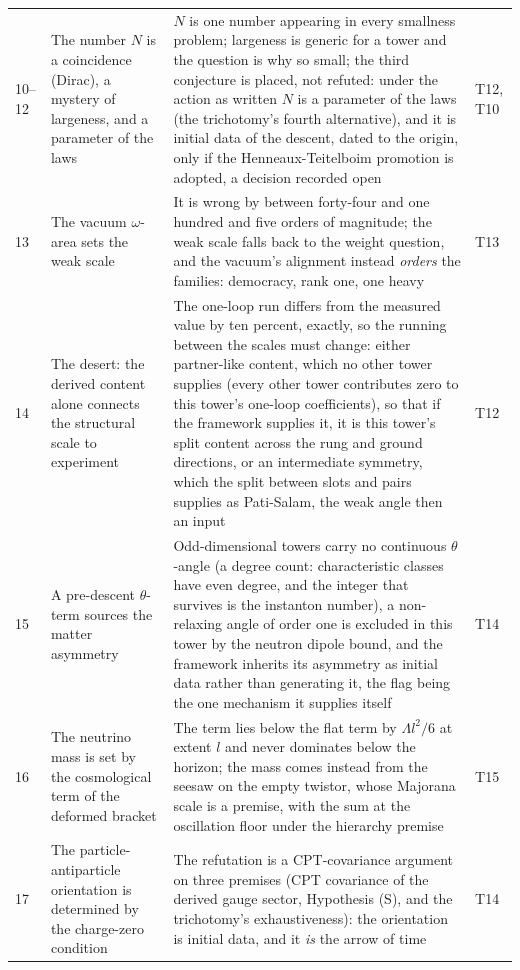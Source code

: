 \documentclass[11pt]{article}
\theoremstyle{definition}
\begin{document}
\begin{longtable}{p{} p{} p{} p{}}
10--12 & The number $N$ is a coincidence (Dirac), a mystery of largeness, and a parameter of the laws & $N$ is one number appearing in every smallness problem; largeness is generic for a tower and the question is why so small; the third conjecture is placed, not refuted: under the action as written $N$ is a parameter of the laws (the trichotomy's fourth alternative), and it is initial data of the descent, dated to the origin, only if the Henneaux-Teitelboim promotion is adopted, a decision recorded open & T12, T10 \\
13 & The vacuum $\omega$-area sets the weak scale & It is wrong by between forty-four and one hundred and five orders of magnitude; the weak scale falls back to the weight question, and the vacuum's alignment instead \emph{orders} the families: democracy, rank one, one heavy & T13 \\
14 & The desert: the derived content alone connects the structural scale to experiment & The one-loop run differs from the measured value by ten percent, exactly, so the running between the scales must change: either partner-like content, which no other tower supplies (every other tower contributes zero to this tower's one-loop coefficients), so that if the framework supplies it, it is this tower's split content across the rung and ground directions, or an intermediate symmetry, which the split between slots and pairs supplies as Pati-Salam, the weak angle then an input & T12 \\
15 & A pre-descent $\theta$-term sources the matter asymmetry & Odd-dimensional towers carry no continuous $\theta$-angle (a degree count: characteristic classes have even degree, and the integer that survives is the instanton number), a non-relaxing angle of order one is excluded in this tower by the neutron dipole bound, and the framework inherits its asymmetry as initial data rather than generating it, the flag being the one mechanism it supplies itself & T14 \\
16 & The neutrino mass is set by the cosmological term of the deformed bracket & The term lies below the flat term by $\Lambda l^{2}/6$ at extent $l$ and never dominates below the horizon; the mass comes instead from the seesaw on the empty twistor, whose Majorana scale is a premise, with the sum at the oscillation floor under the hierarchy premise & T15 \\
17 & The particle-antiparticle orientation is determined by the charge-zero condition & The refutation is a CPT-covariance argument on three premises (CPT covariance of the derived gauge sector, Hypothesis (S), and the trichotomy's exhaustiveness): the orientation is initial data, and it \emph{is} the arrow of time & T14 \\

\end{longtable}
\end{document}
